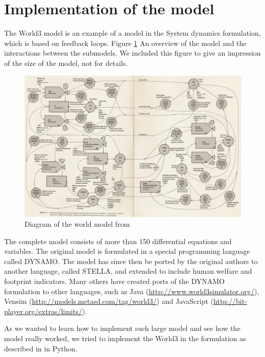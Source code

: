 \documentclass[10pt,a4paper]{scrartcl}
\begin{document}
\section*{Implementation of the model}

The World3 model is an example of a model in the System dynamics formulation, which is based on feedback loops. Figure \ref{world3} An overview of the model and the interactions between the submodels. We included this figure to give an impression of the size of the model, not for details.

\begin{figure}
\centering
\includegraphics[width=\textwidth]{./plaatjes/model.jpg}
\caption{Diagram of the world model from \cite{forresterworld}}
\label{world3}
\end{figure}

The complete model consists of more than 150 differential equations and variables. The original model is formulated in a special programming language called DYNAMO. The model has since then be ported by the original authors to another language, called STELLA, and extended to include human welfare and footprint indicators. Many others have created ports of the DYNAMO formulation to other languages, such as Java (\url{http://www.world3simulator.org/}), Vensim (\url{http://models.metasd.com/tag/world3/}) and JavaScript (\url{http://bit-player.org/extras/limits/}).

As we wanted to learn how to implement such large model and see how the model really worked, we tried to implement the World3 in the formulation as described in \cite{thissen1978investigations} in Python.
\end{document}
